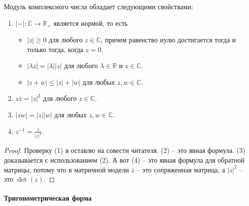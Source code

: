 \begin{claim*}
Модуль комплексного числа обладает следующими свойствами:
\begin{enumerate}
\item $|{-}|\colon \mathbb C\to \mathbb R_+$ является нормой, то есть 
\begin{itemize}
\item $|z| \geqslant 0$ для любого $z\in\mathbb C$, причем равенство нулю достигается тогда и только тогда, когда $z = 0$.

\item $|\lambda z| = |\lambda | |z|$ для любого $\lambda \in \mathbb R$ и $z\in\mathbb C$.

\item $|z + w|\leqslant |z| + |w|$ для любых $z,w\in\mathbb C$.
\end{itemize}

\item $z\bar z = |z|^2$ для любого $z\in\mathbb C$.

\item $|zw| = |z| |w|$ для любых $z,w\in\mathbb C$.

\item $z^{-1} = \frac{\bar z}{|z|^2}$.
\end{enumerate}
\end{claim*}
\begin{proof}
Проверку (1) я оставлю на совести читателя.
(2) -- это явная формула.
(3) доказывается с использованием (2).
А вот (4) -- это явная формула для обратной матрицы, потому что в матричной модели $\bar z$ -- это сопряженная матрица, а $|z|^2$ -- это $\det (z)$.
\end{proof}

\paragraph{Тригонометрическая форма}


